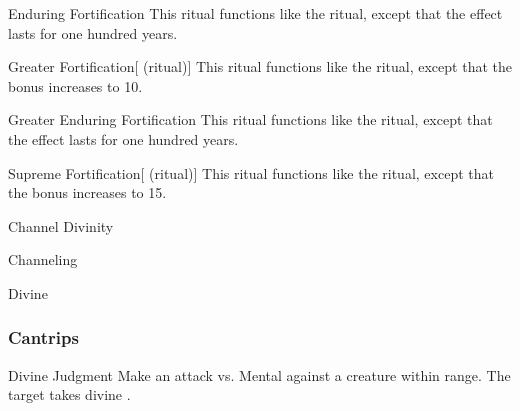 \lowercase{\hypertarget{spell:Enduring Fortification}{}}\label{spell:Enduring Fortification}
\begin{apability}[\nth{3}]{\hypertarget{spell:Enduring Fortification}{Enduring Fortification}}
This ritual functions like the  ritual, except that the effect lasts for one hundred years.
\end{apability}
\vspace{0.25em}



\lowercase{\hypertarget{spell:Greater Fortification}{}}\label{spell:Greater Fortification}
\begin{attuneability}[\nth{3}]{\hypertarget{spell:Greater Fortification}{Greater Fortification}}[ (ritual)]
This ritual functions like the  ritual, except that the  bonus increases to 10.
\end{attuneability}
\vspace{0.25em}



\lowercase{\hypertarget{spell:Greater Enduring Fortification}{}}\label{spell:Greater Enduring Fortification}
\begin{apability}[\nth{5}]{\hypertarget{spell:Greater Enduring Fortification}{Greater Enduring Fortification}}
This ritual functions like the  ritual, except that the effect lasts for one hundred years.
\end{apability}
\vspace{0.25em}



\lowercase{\hypertarget{spell:Supreme Fortification}{}}\label{spell:Supreme Fortification}
\begin{attuneability}[\nth{6}]{\hypertarget{spell:Supreme Fortification}{Supreme Fortification}}[ (ritual)]
This ritual functions like the  ritual, except that the  bonus increases to 15.
\end{attuneability}
\vspace{0.25em}


\newpage
\begin{spellsection}{Channel Divinity}

\begin{spellheader}
\end{spellheader}


 Channeling

 Divine

\subsubsection{Cantrips}


\begin{freeability}{Divine Judgment}
Make an attack vs. Mental against a creature within \rngmed range.
\hit The target takes divine .
\end{freeability}

\end{spellsection}


